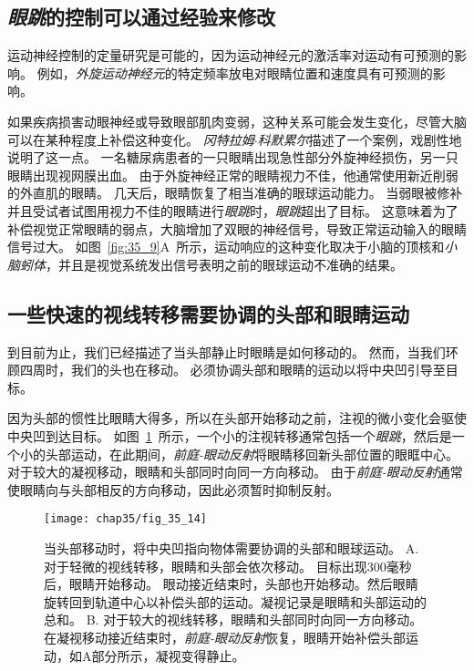 \subsection{\textit{眼跳}的控制可以通过经验来修改}

运动神经控制的定量研究是可能的，因为运动神经元的激活率对运动有可预测的影响。
例如，\textit{外旋运动神经元}的特定频率放电对眼睛位置和速度具有可预测的影响。


如果疾病损害动眼神经或导致眼部肌肉变弱，这种关系可能会发生变化，尽管大脑可以在某种程度上补偿这种变化。
\textit{冈特拉姆$\cdot$科默累尔}描述了一个案例，戏剧性地说明了这一点。
一名糖尿病患者的一只眼睛出现急性部分外旋神经损伤，另一只眼睛出现视网膜出血。
由于外旋神经正常的眼睛视力不佳，他通常使用新近削弱的外直肌的眼睛。
几天后，眼睛恢复了相当准确的眼球运动能力。
当弱眼被修补并且受试者试图用视力不佳的眼睛进行\textit{眼跳}时，\textit{眼跳}超出了目标。
这意味着为了补偿视觉正常眼睛的弱点，大脑增加了双眼的神经信号，导致正常运动输入的眼睛信号过大。
如图~\ref{fig:35_9}A~所示，运动响应的这种变化取决于小脑的顶核和\textit{小脑蚓体}，并且是视觉系统发出信号表明之前的眼球运动不准确的结果。



\subsection{一些快速的视线转移需要协调的头部和眼睛运动}

到目前为止，我们已经描述了当头部静止时眼睛是如何移动的。
然而，当我们环顾四周时，我们的头也在移动。
必须协调头部和眼睛的运动以将中央凹引导至目标。


因为头部的惯性比眼睛大得多，所以在头部开始移动之前，注视的微小变化会驱使中央凹到达目标。
如图~\ref{fig:35_14}~所示，一个小的注视转移通常包括一个\textit{眼跳}，然后是一个小的头部运动，在此期间，\textit{前庭-眼动反射}将眼睛移回新头部位置的眼眶中心。
对于较大的凝视移动，眼睛和头部同时向同一方向移动。
由于\textit{前庭-眼动反射}通常使眼睛向与头部相反的方向移动，因此必须暂时抑制反射。


\begin{figure}[htbp]
	\centering
	\texttt{[image: chap35/fig\_35\_14]}
	\caption{当头部移动时，将中央凹指向物体需要协调的头部和眼球运动。
		A. 对于轻微的视线转移，眼睛和头部会依次移动。
		目标出现300毫秒后，眼睛开始移动。
		眼动接近结束时，头部也开始移动。然后眼睛旋转回到轨道中心以补偿头部的运动。凝视记录是眼睛和头部运动的总和\cite{zee1977disorders}。
		B. 对于较大的视线转移，眼睛和头部同时向同一方向移动。
		在凝视移动接近结束时，\textit{前庭-眼动反射}恢复，眼睛开始补偿头部运动，如A部分所示，凝视变得静止\cite{laurutis1986vestibulo}。}
	\label{fig:35_14}
\end{figure}



